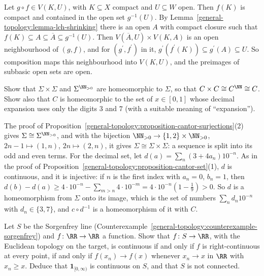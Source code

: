 \begin{solution}
Let $g \circ f \in V(K, U)$, with $K \subseteq X$ compact and $U \subseteq W$ open. Then $f(K)$ is compact and contained in the open set $g^{-1}(U)$. By Lemma~\ref{general-topology:lemma-lch-shrinking}
there is an open $A$ with compact closure such that $f(K) \subseteq A \subseteq \overline{A} \subseteq g^{-1}(U)$. Then $V(\overline{A}, U) \times V(K, A)$ is an open neighbourhood of $(g, f)$, and for
$(g^{\prime}, f^{\prime})$ in it, $g^{\prime}(f^{\prime}(K)) \subseteq g^{\prime}(A) \subseteq U$. So composition maps this neighbourhood into $V(K, U)$, and the preimages of subbasic open sets are open.
\end{solution}

\begin{exercise}\label{general-topology:exercise-cantor-products}
Show that $\Sigma \times \Sigma$ and $\Sigma^{\NN_{>0}}$ are homeomorphic to $\Sigma$, so that $C \times C \cong C^\NN \cong C$. Show also that $C$ is homeomorphic to the set of $x \in [0, 1]$ whose decimal
expansion uses only the digits $3$ and $7$ (with a suitable meaning of ``expansion'').
\end{exercise}

\begin{solution}
The proof of Proposition~\ref{general-topology:proposition-cantor-surjections}(2) gives $\Sigma \cong \Sigma^{\NN_{>0}}$, and with the bijection $\NN_{>0} \to \{1, 2\} \times \NN_{>0}$, $2n - 1 \mapsto (1, n)$, $2n \mapsto (2, n)$,
it gives $\Sigma \cong \Sigma \times \Sigma$: a sequence is split into its odd and even terms. For the decimal set, let $d(a) = \sum_n(3 + 4a_n)10^{-n}$. As in the proof of
Proposition~\ref{general-topology:proposition-cantor-set}(1), $d$ is continuous, and it is injective: if $n$ is the first index with $a_n = 0$, $b_n = 1$, then
$d(b) - d(a) \geq 4 \cdot 10^{-n} - \sum_{m > n}4 \cdot 10^{-m} = 4 \cdot 10^{-n}(1 - \frac19) > 0$. So $d$ is a homeomorphism from $\Sigma$ onto its image, which is the set of numbers $\sum_nd_n10^{-n}$ with
$d_n \in \{3, 7\}$, and $c \circ d^{-1}$ is a homeomorphism of it with $C$.
\end{solution}

\begin{exercise}\label{general-topology:exercise-sorgenfrey-right-continuous}
Let $S$ be the Sorgenfrey line (Counterexample~\ref{general-topology:counterexample-sorgenfrey}) and $f \colon \RR \to \RR$ a function. Show that $f \colon S \to \RR$, with the Euclidean topology on the target, is continuous if and only
if $f$ is right-continuous at every point, if and only if $f(x_n) \to f(x)$ whenever $x_n \to x$ in $\RR$ with $x_n \geq x$. Deduce that $\mathbf{1}_{[0, \infty)}$ is continuous on $S$, and that $S$ is not connected.
\end{exercise}

